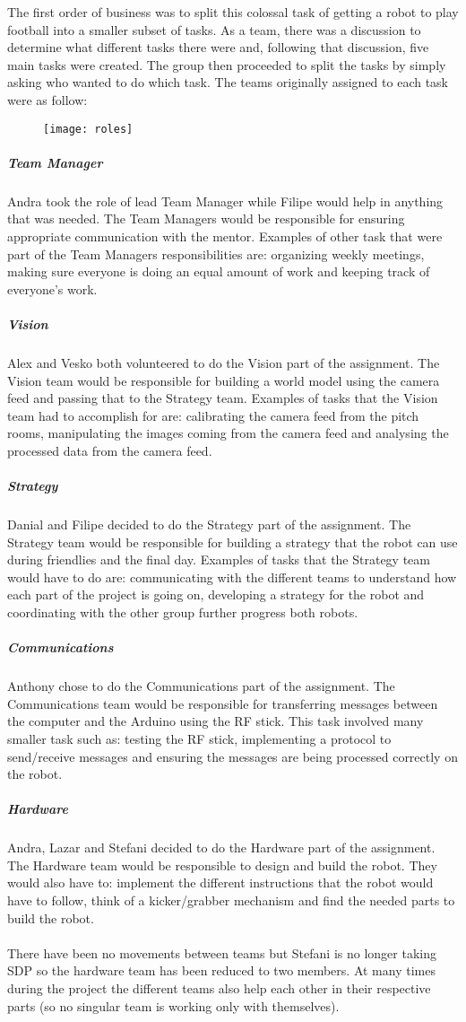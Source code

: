 The first order of business was to split this colossal task of getting a robot to play football into a smaller subset of tasks. As a team, there was a discussion to determine what different tasks there were and, following that discussion, five main tasks were created. The group then proceeded to split the tasks by simply asking who wanted to do which task. The teams originally assigned to each task were as follow:

\begin{figure}[H]
    \centering
    \texttt{[image: roles]}
    \label{fig:roles}
\end{figure}

\subparagraph{Team Manager}
Andra took the role of lead Team Manager while Filipe would help in anything that was needed. The Team Managers would be responsible for ensuring appropriate communication with the mentor. Examples of other task that were part of the Team Managers responsibilities are: organizing weekly meetings, making sure everyone is doing an equal amount of work and keeping track of everyone's work.


\subparagraph{Vision}
Alex and Vesko both volunteered to do the Vision part of the assignment. The Vision team would be responsible for building a world model using the camera feed and passing that to the Strategy team. Examples of tasks that the Vision team had to accomplish for are: calibrating the camera feed from the pitch rooms, manipulating the images coming from the camera feed and analysing the processed data from the camera feed.

\subparagraph{Strategy}
Danial and Filipe decided to do the Strategy part of the assignment. The Strategy team would be responsible for building a strategy that the robot can use during friendlies and the final day. Examples of tasks that the Strategy team would have to do are: communicating with the different teams to understand how each part of the project is going on, developing a strategy for the robot and coordinating with the other group further progress both robots.

\subparagraph{Communications}
Anthony chose to do the Communications part of the assignment. The Communications team would be responsible for transferring messages between the computer and the Arduino using the RF stick. This task involved many smaller task such as: testing the RF stick, implementing a protocol to send/receive messages and ensuring the messages are being processed correctly on the robot.

\subparagraph{Hardware}
Andra, Lazar and Stefani decided to do the Hardware part of the assignment. The Hardware team would be responsible to design and build the robot. They would also have to: implement the different instructions that the robot would have to follow, think of a kicker/grabber mechanism and find the needed parts to build the robot.
\\ \\
There have been no movements between teams but Stefani is no longer taking SDP so the hardware team has been reduced to two members. At many times during the project the different teams also help each other in their respective parts (so no singular team is working only with themselves).